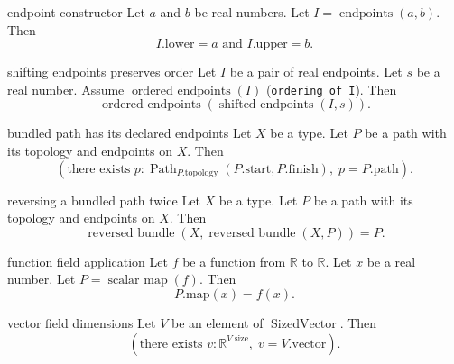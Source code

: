 \begin{cleanresult}{endpoint constructor}
Let $a$ and $b$ be real numbers.
Let $I = \operatorname{endpoints}(a, b)$.
Then \[I.\mathrm{lower}=a\text{ and }I.\mathrm{upper}=b.\]
\end{cleanresult}

\begin{cleanresult}{shifting endpoints preserves order}
Let $I$ be a pair of real endpoints.
Let $s$ be a real number.
Assume $\operatorname{ordered\ endpoints}(I)$ (\texttt{ordering of I}).
Then \[\operatorname{ordered\ endpoints}(\operatorname{shifted\ endpoints}(I, s)).\]
\end{cleanresult}

\begin{cleanresult}{bundled path has its declared endpoints}
Let $X$ be a type.
Let $P$ be a path with its topology and endpoints on $X$.
Then \[\left(\text{there exists }p : \operatorname{Path}_{P.\mathrm{topology}}(P.\mathrm{start},P.\mathrm{finish}),\; p=P.\mathrm{path}\right).\]
\end{cleanresult}

\begin{cleanresult}{reversing a bundled path twice}
Let $X$ be a type.
Let $P$ be a path with its topology and endpoints on $X$.
Then \[\operatorname{reversed\ bundle}(X, \operatorname{reversed\ bundle}(X, P))=P.\]
\end{cleanresult}

\begin{cleanresult}{function field application}
Let $f$ be a function from $\mathbb{R}$ to $\mathbb{R}$.
Let $x$ be a real number.
Let $P = \operatorname{scalar\ map}(f)$.
Then \[P.\mathrm{map}(x)=f(x).\]
\end{cleanresult}

\begin{cleanresult}{vector field dimensions}
Let $V$ be an element of $\operatorname{SizedVector}$.
Then \[\left(\text{there exists }v : \mathbb{R}^{V.\mathrm{size}},\; v=V.\mathrm{vector}\right).\]
\end{cleanresult}

